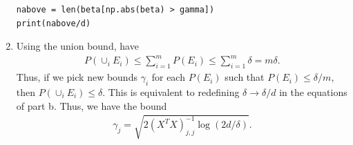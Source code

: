 \documentclass{article}
\begin{document}
\begin{enumerate}
\begin{verbatim}
nabove = len(beta[np.abs(beta) > gamma])
print(nabove/d)
        \end{verbatim}






        \item Using the union bound, have
        \begin{align*}
                P(\cup_i E_i) \leq \sum_{i=1}^m P(E_i) \leq \sum_{i=1}^m \delta = m \delta.
        \end{align*}
        Thus, if we pick new bounds $\gamma_i$ for each $P(E_i)$ such that $P(E_i) \leq \delta / m$, then $P(\cup_i E_i) \leq \delta$.
        This is equivalent to redefining $\delta \to \delta/d$ in the equations of part b.
        Thus, we have the bound
        \begin{align*}
                \gamma_j = \sqrt{2(X^T X)_{j,j}^{-1} \log(2d/\delta)}.
        \end{align*}
\end{enumerate}
\end{document}

